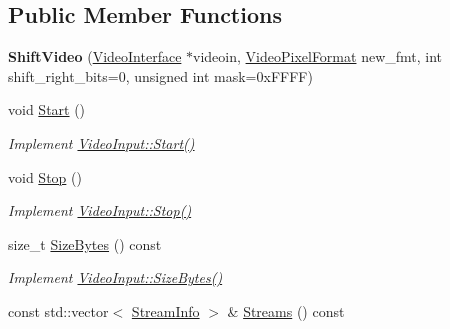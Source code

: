 \subsection*{Public Member Functions}
\begin{DoxyCompactItemize}
\item 
{\bfseries Shift\+Video} (\hyperlink{structpangolin_1_1_video_interface}{Video\+Interface} $\ast$videoin, \hyperlink{structpangolin_1_1_video_pixel_format}{Video\+Pixel\+Format} new\+\_\+fmt, int shift\+\_\+right\+\_\+bits=0, unsigned int mask=0x\+F\+F\+F\+F)\hypertarget{classpangolin_1_1_shift_video_a8ad45176015a35aed0e50481c2badce4}{}\label{classpangolin_1_1_shift_video_a8ad45176015a35aed0e50481c2badce4}

\item 
void \hyperlink{classpangolin_1_1_shift_video_abd1b69a437aed53dbcf6e064a15d82a3}{Start} ()\hypertarget{classpangolin_1_1_shift_video_abd1b69a437aed53dbcf6e064a15d82a3}{}\label{classpangolin_1_1_shift_video_abd1b69a437aed53dbcf6e064a15d82a3}

\begin{DoxyCompactList}\small\item\em Implement \hyperlink{structpangolin_1_1_video_input_a74a2e3e1b87c7cbf9de9bcb39e1df128}{Video\+Input\+::\+Start()} \end{DoxyCompactList}\item 
void \hyperlink{classpangolin_1_1_shift_video_a403662f0304427ea8ca047e7d02fb369}{Stop} ()\hypertarget{classpangolin_1_1_shift_video_a403662f0304427ea8ca047e7d02fb369}{}\label{classpangolin_1_1_shift_video_a403662f0304427ea8ca047e7d02fb369}

\begin{DoxyCompactList}\small\item\em Implement \hyperlink{structpangolin_1_1_video_input_a8945f80194cc7ec9594db7f27e7d09b8}{Video\+Input\+::\+Stop()} \end{DoxyCompactList}\item 
size\+\_\+t \hyperlink{classpangolin_1_1_shift_video_aaaf42a6603580c8376769d144945df0e}{Size\+Bytes} () const \hypertarget{classpangolin_1_1_shift_video_aaaf42a6603580c8376769d144945df0e}{}\label{classpangolin_1_1_shift_video_aaaf42a6603580c8376769d144945df0e}

\begin{DoxyCompactList}\small\item\em Implement \hyperlink{structpangolin_1_1_video_input_a93cee5c33386973a2a51165e6bdcf40b}{Video\+Input\+::\+Size\+Bytes()} \end{DoxyCompactList}\item 
const std\+::vector$<$ \hyperlink{classpangolin_1_1_stream_info}{Stream\+Info} $>$ \& \hyperlink{classpangolin_1_1_shift_video_a63488eb65d208cc1b05a9d4baf3d6058}{Streams} () const \hypertarget{classpangolin_1_1_shift_video_a63488eb65d208cc1b05a9d4baf3d6058}{}\label{classpangolin_1_1_shift_video_a63488eb65d208cc1b05a9d4baf3d6058}


\end{DoxyCompactItemize}

